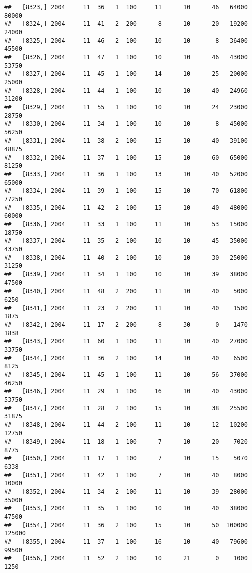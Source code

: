 \documentclass{article}\usepackage[]{graphicx}\usepackage[]{color}
\makeatletter
\newenvironment{kframe}{%
 \def\at@end@of@kframe{}%
 \ifinner\ifhmode%
  \def\at@end@of@kframe{\end{minipage}}%
  \begin{minipage}{\columnwidth}%
 \fi\fi%
 \def\FrameCommand##1{\hskip\@totalleftmargin \hskip-\fboxsep
 \colorbox{shadecolor}{##1}\hskip-\fboxsep
     \hskip-\linewidth \hskip-\@totalleftmargin \hskip\columnwidth}%
 \MakeFramed {\advance\hsize-\width
   \@totalleftmargin\z@ \linewidth\hsize
   \@setminipage}}%
 {\par\unskip\endMakeFramed%
 \at@end@of@kframe}
\newenvironment{knitrout}{}{} %
\makeatother
\begin{document}
\begin{knitrout}
\begin{kframe}
\begin{verbatim}
##   [8323,] 2004     11  36   1  100     11      10      46   64000   80000
##   [8324,] 2004     11  41   2  200      8      10      20   19200   24000
##   [8325,] 2004     11  46   2  100     10      10       8   36400   45500
##   [8326,] 2004     11  47   1  100     10      10      46   43000   53750
##   [8327,] 2004     11  45   1  100     14      10      25   20000   25000
##   [8328,] 2004     11  44   1  100     10      10      40   24960   31200
##   [8329,] 2004     11  55   1  100     10      10      24   23000   28750
##   [8330,] 2004     11  34   1  100     10      10       8   45000   56250
##   [8331,] 2004     11  38   2  100     15      10      40   39100   48875
##   [8332,] 2004     11  37   1  100     15      10      60   65000   81250
##   [8333,] 2004     11  36   1  100     13      10      40   52000   65000
##   [8334,] 2004     11  39   1  100     15      10      70   61800   77250
##   [8335,] 2004     11  42   2  100     15      10      40   48000   60000
##   [8336,] 2004     11  33   1  100     11      10      53   15000   18750
##   [8337,] 2004     11  35   2  100     10      10      45   35000   43750
##   [8338,] 2004     11  40   2  100     10      10      30   25000   31250
##   [8339,] 2004     11  34   1  100     10      10      39   38000   47500
##   [8340,] 2004     11  48   2  200     11      10      40    5000    6250
##   [8341,] 2004     11  23   2  200     11      10      40    1500    1875
##   [8342,] 2004     11  17   2  200      8      30       0    1470    1838
##   [8343,] 2004     11  60   1  100     11      10      40   27000   33750
##   [8344,] 2004     11  36   2  100     14      10      40    6500    8125
##   [8345,] 2004     11  45   1  100     11      10      56   37000   46250
##   [8346,] 2004     11  29   1  100     16      10      40   43000   53750
##   [8347,] 2004     11  28   2  100     15      10      38   25500   31875
##   [8348,] 2004     11  44   2  100     11      10      12   10200   12750
##   [8349,] 2004     11  18   1  100      7      10      20    7020    8775
##   [8350,] 2004     11  17   1  100      7      10      15    5070    6338
##   [8351,] 2004     11  42   1  100      7      10      40    8000   10000
##   [8352,] 2004     11  34   2  100     11      10      39   28000   35000
##   [8353,] 2004     11  35   1  100     10      10      40   38000   47500
##   [8354,] 2004     11  36   2  100     15      10      50  100000  125000
##   [8355,] 2004     11  37   1  100     16      10      40   79600   99500
##   [8356,] 2004     11  52   2  100     10      21       0    1000    1250

\end{verbatim}
\end{kframe}
\end{knitrout}
\end{document}
